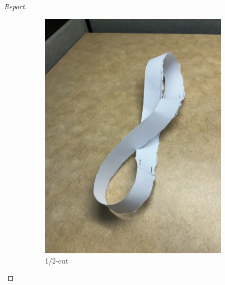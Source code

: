 \documentclass{article}
\begin{document}
\begin{proof}[Report]
\begin{figure}[htp]
\begin{subfigure}[b]{0.45\textwidth}
            \includegraphics[width=\textwidth]{halfcut.jpg}
            \caption{1/2-cut}
            \label{fig:fig2}
        \end{subfigure}
        \begin{subfigure}[b]{0.45\textwidth}

\end{subfigure}
\end{figure}
\end{proof}
\end{document}
